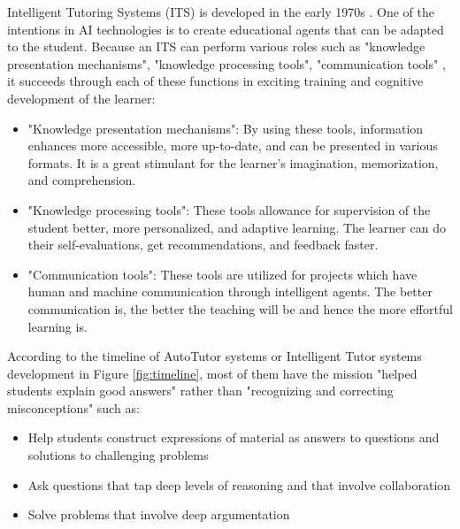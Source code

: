 \documentclass[letterpaper%
, twoside%
, 12pt%
,these%
, english%
,creativecommons,hyperref, withAlgo2e %
]{thETS}
\begin{document}
\begin{introduction}


Intelligent Tutoring Systems (ITS) is developed in the early 1970s \cite{Brown}. One of the intentions in AI technologies is to create educational agents that can be adapted to the student. Because an ITS can perform various roles such as "knowledge presentation mechanisms", "knowledge processing tools", "communication tools" \cite{Tchounikine}, it succeeds through each of these functions in exciting training and cognitive development of the learner: 
\begin{itemize}
	\item     "Knowledge presentation mechanisms": By using these tools, information enhances more accessible, more up-to-date, and can be presented in various formats. It is a great stimulant for the learner's imagination, memorization, and comprehension.
	\item     "Knowledge processing tools": These tools allowance for supervision of the student better, more personalized, and adaptive learning. The learner can do their self-evaluations, get recommendations, and feedback faster.
	\item "Communication tools": These tools are utilized for projects which have human and machine communication through intelligent agents. The better communication is, the better the teaching will be and hence the more effortful learning is. 
\end{itemize}

According to the timeline of AutoTutor systems or Intelligent Tutor systems development in Figure \ref{fig:timeline}, most of them have the mission "helped students explain good answers" rather than "recognizing and correcting misconceptions" such as:
\begin{itemize}
	\item Help students construct expressions of material as answers to questions and solutions to challenging problems
	\item Ask questions that tap deep levels of reasoning and that involve collaboration
	\item Solve problems that involve deep argumentation
\end{itemize}


\begin{figure}
	\centering
	

\end{figure}
\end{introduction}
\end{document}
